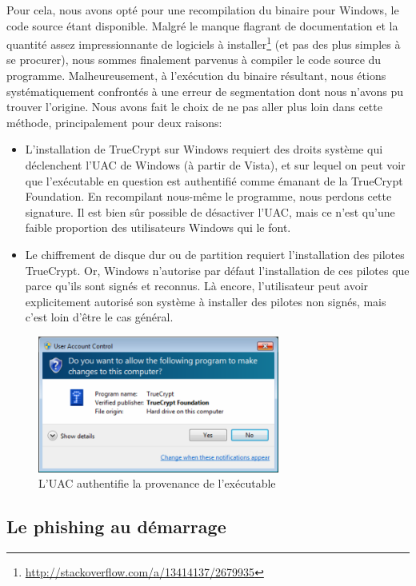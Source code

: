 \documentclass[12pt,a4paper]{article}
\begin{document}
Pour cela, nous avons opté pour une recompilation du binaire pour Windows, le code source étant disponible. Malgré le manque flagrant de documentation et la quantité assez impressionnante de logiciels à installer\footnote{\url{http://stackoverflow.com/a/13414137/2679935}} (et pas des plus simples à se procurer), nous sommes finalement parvenus à compiler le code source du programme. Malheureusement, à l'exécution du binaire résultant, nous étions systématiquement confrontés à une erreur de segmentation dont nous n'avons pu trouver l'origine. Nous avons fait le choix de ne pas aller plus loin dans cette méthode, principalement pour deux raisons:
\begin{itemize}
	\item L'installation de TrueCrypt sur Windows requiert des droits système qui déclenchent l'UAC de Windows (à partir de Vista), et sur lequel on peut voir que l'exécutable en question est authentifié comme émanant de la TrueCrypt Foundation. En recompilant nous-même le programme, nous perdons cette signature. Il est bien sûr possible de désactiver l'UAC, mais ce n'est qu'une faible proportion des utilisateurs Windows qui le font.
	\item Le chiffrement de disque dur ou de partition requiert l'installation des pilotes TrueCrypt. Or, Windows n'autorise par défaut l'installation de ces pilotes que parce qu'ils sont signés et reconnus. Là encore, l'utilisateur peut avoir explicitement autorisé son système à installer des pilotes non signés, mais c'est loin d'être le cas général.
\end{itemize}

\begin{figure}[H]
	\centering
	\includegraphics[width=300px]{img/truecrypt_uac.png}
	\caption{L'UAC authentifie la provenance de l'exécutable}
\end{figure}



\subsection{Le phishing au démarrage}
\end{document}
